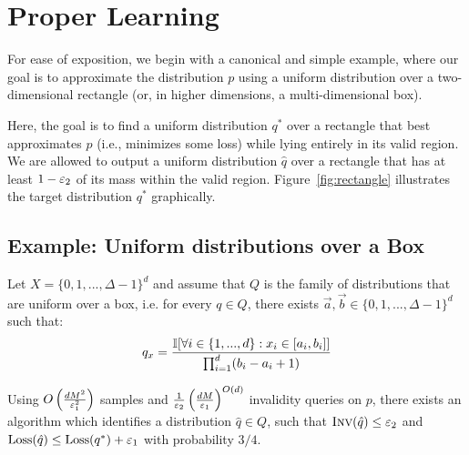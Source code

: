 \section{Proper Learning}
\label{sec:proper}
For ease of exposition, we begin with a canonical and simple example, where our goal is to approximate the distribution $p$ using a 
uniform distribution over a two-dimensional rectangle (or, in higher dimensions, a multi-dimensional box).

Here, the goal is to find a uniform distribution $q^*$ over a rectangle that best approximates
$p$ (i.e., minimizes some loss) while lying entirely in its valid region. 
We are allowed to output a uniform distribution $\hat q$ over a rectangle that has at least $1-\varepsilon_2$ of its mass within the valid region.
Figure~\ref{fig:rectangle} illustrates the target distribution $q^*$ graphically.

\subsection{Example: Uniform distributions over a Box}

Let $X = \{0,1,...,\Delta-1\}^d$ and assume that $Q$ is the family of distributions that are uniform over a box, i.e.
for every $q \in Q$, there exists $\vec a, \vec b \in \{0,1,...,\Delta-1\}^d$ such that:
$$q_x = \frac { \mathbb{I}[ \forall i \in \{1,...,d\}: x_i \in [a_i, b_i] ] } { \prod_{i=1}^d (b_i-a_i+1) }$$

\begin{theorem}
  Using $O\left(\frac {d M^2} {\varepsilon_1^2} \right)$ samples and $\frac {1} {\varepsilon_2} \left(\frac {d M} {\varepsilon_1} \right)^{O( d )}$ invalidity queries on $p$, there exists an algorithm which identifies a distribution $\hat q \in Q$, such that $\textsc{Inv}(\hat q) \le \varepsilon_2$ and 
  $\text{Loss}(\hat q) \le \text{Loss}(q^*) + \varepsilon_1$ with probability $3/4$.
\end{theorem}

